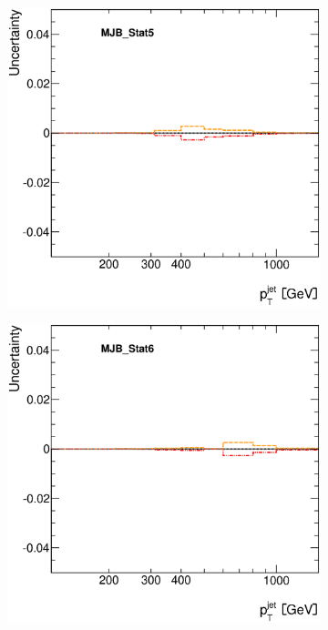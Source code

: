 \documentclass[12pt, twoside]{article}
\numberwithin{equation}{section}
\numberwithin{figure}{section}
\newenvironment{changemargin}[2]{%
\begin{list}{}{%
\setlength{\topsep}{0pt}%
\setlength{\leftmargin}{#1}%
\setlength{\rightmargin}{#2}%
\setlength{\listparindent}{\parindent}%
\setlength{\itemindent}{\parindent}%
\setlength{\parsep}{\parskip}%
}%
\item[]}{\end{list}}
\begin{document}
\begin{figure}[H]
\begin{changemargin}{-1.0cm}{-0.75cm}
\begin{changemargin}{-0.75cm}{-1.0cm}
\begin{subfigure}[b]{0.25\textwidth}
        \end{subfigure}
        \begin{subfigure}[b]{0.25\textwidth}
            \includegraphics[width=\textwidth]{./images/JetSystematics/JetSystematic-31.eps}
        \end{subfigure}
        \begin{subfigure}[b]{0.25\textwidth}
            \includegraphics[width=\textwidth]{./images/JetSystematics/JetSystematic-32.eps}
        \end{subfigure}


\end{changemargin}
\end{changemargin}
\end{figure}
\end{document}
